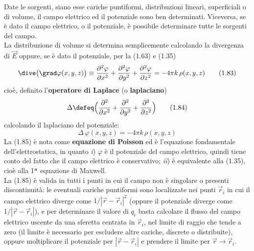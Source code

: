 Date le sorgenti, siano esse cariche puntiformi, distribuzioni lineari,
superficiali o di volume, il campo elettrico ed il potenziale sono ben
determinati. Viceversa, se \`e dato il campo elettrico, o il potenziale, \`e
possibile determinare tutte le sorgenti del campo.\\
La distribuzione di volume si determina semplicemente calcolando la divergenza
di $\vec E$ oppure, se \`e dato il potenziale, per la (1.63) e (1.35)
\begin{equation}
  \dive\big(\grad\varphi(x,y,z)\big)\equiv\frac{\partial^2\varphi}{\partial x^2}
  +\frac{\partial^2\varphi}{\partial y^2}+\frac{\partial^2\varphi}{\partial z^2}
  =-4\pi k\,\rho(x,y,z)
  \tag{1.83}
\end{equation}
cio\`e, definito l'\textbf{operatore di Laplace} (o \textbf{laplaciano})
\begin{equation}
  \Delta\defeq\Big(\frac{\partial^2}{\partial x^2}
  +\frac{\partial^2}{\partial y^2}+\frac{\partial^2}{\partial z^2}\Big)
  \tag{1.84}
\end{equation}
calcolando il laplaciano del potenziale:
\begin{equation}
  \Delta\,\varphi(x,y,z)=-4\pi k\,\rho(x,y,z)
  \tag{1.85}
\end{equation}
La (1.85) \`e nota come \textbf{equazione di Poisson} ed \`e l'equazione
fondamentale dell'elettrostatica, in quanto \textit{i}) $\varphi$ \`e il
potenziale del campo elettrico, quindi tiene conto del fatto che il campo
elettrico \`e conservativo; \textit{ii}) \`e equivalente alla (1.35), cio\`e
alla 1$^{\rm a}$ equazione di Maxwell.\\
La (1.85) \`e valida in tutti i punti in cui il campo non \`e singolare o
presenti discontinuit\`a: le eventuali cariche puntiformi sono localizzate nei
punti $\vec r_i$ in cui il campo elettrico diverge come $1/|\vec r-\vec r_i|^2$
(oppure il potenziale diverge come $1/|\vec r-\vec r_i|$), e
per determinare il valore di $q_i$ basta calcolare il flusso del campo elettrico
uscente da una sferetta centrata in $\vec r_i$, nel limite di raggio che tende a
zero (il limite \`e necessario per escludere altre cariche, discrete o
distribuite), oppure moltiplicare il potenziale per $|\vec r-\vec r_i|$ e
prendere il limite per $\vec r\to\vec r_i$.

